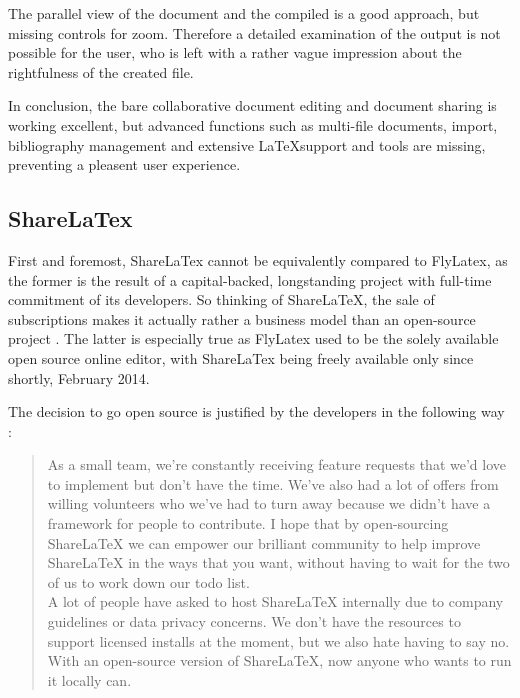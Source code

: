 The parallel view of the document and the compiled  is a good approach, but missing controls for zoom. Therefore a detailed examination of the output is not possible for the user, who is left with a rather vague impression about the rightfulness of the created  file.

In conclusion, the bare collaborative document editing and document sharing is working excellent, but advanced functions such as multi-file documents, import, bibliography management and extensive \LaTeX support and tools are missing, preventing a pleasent user experience.

\subsection{ShareLaTex}
\label{subsec:sharelatex}
First and foremost, ShareLaTex cannot be equivalently compared to FlyLatex, as the former is the result of a capital-backed, longstanding project with full-time commitment of its developers. So thinking of ShareLaTeX, the sale of subscriptions makes it actually rather a business model than an open-source project \cite{website:sharelatex-team} \cite{website:sharelatex-subscriptions}. The latter is especially true as FlyLatex used to be the solely available open source online editor, with ShareLaTex being freely available only since shortly, February 2014.

The decision to go open source is justified by the developers in the following way \cite{website:sharelatex-oss}:

\begin{quotation}
As a small team, we're constantly receiving feature requests that we'd love to implement but don't have the time. We've also had a lot of offers from willing volunteers who we've had to turn away because we didn't have a framework for people to contribute. I hope that by open-sourcing ShareLaTeX we can empower our brilliant community to help improve ShareLaTeX in the ways that you want, without having to wait for the two of us to work down our todo list. \\

A lot of people have asked to host ShareLaTeX internally due to company guidelines or data privacy concerns. We don't have the resources to support licensed installs at the moment, but we also hate having to say no. With an open-source version of ShareLaTeX, now anyone who wants to run it locally can.
\end{quotation}

